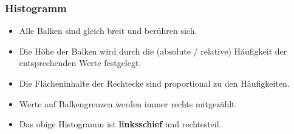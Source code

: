 \begin{multicols}{2}
\keinHeaderUndKeinFooter{}

\subsubsection*{Histogramm}
\keinHeaderUndKeinFooter{}

\begin{itemize}
\item Alle Balken sind gleich breit und berühren sich.
\item Die Höhe der Balken wird durch die (absolute / relative) Häufigkeit der entsprechenden
  Werte festgelegt.
\item Die Flächeninhalte der Rechtecke sind proportional
  zu den Häufigkeiten.
\item Werte auf Balkengrenzen werden immer rechts mitgezählt.
\item Das obige Histogramm ist \textbf{linksschief} und rechtssteil.
\end{itemize}



\end{multicols}



